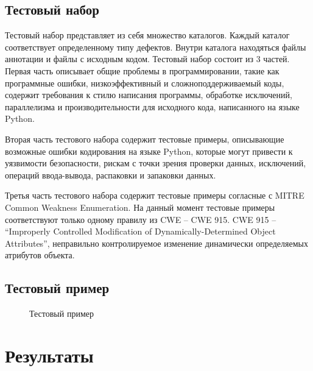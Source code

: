 \section{Тестовый набор}\label{sec:ch3/sect3}
Тестовый набор представляет из себя множество каталогов. Каждый каталог соответствует определенному типу дефектов. 
Внутри каталога находяться файлы аннотации и файлы с исходным кодом. Тестовый набор состоит из 3 частей. 
Первая часть описывает общие проблемы в
программировании, такие как программные ошибки, низкоэффективный и сложноподдерживаемый коды, содержит требования к стилю написания
программы, обработке исключений, параллелизма и производительности для исходного кода, написанного на языке Python.

Вторая часть тестового набора содержит тестовые примеры, описывающие 
возможные ошибки кодирования на языке Python, которые
могут привести к уязвимости безопасности, рискам с точки зрения проверки данных, исключений, операций ввода-вывода, распаковки и запаковки данных. 

Третья часть тестового набора содержит тестовые примеры согласные с
MITRE Common Weakness Enumeration. На данный момент тестовые примеры соответствуют только одному правилу из CWE -- CWE 915. 
CWE 915 -- ``Improperly
Controlled Modification of Dynamically-Determined Object Attributes'', неправильно
контролируемое изменение динамически определяемых атрибутов объекта.

\section{Тестовый пример}
\begin{figure}[ht]
  \caption{Тестовый пример}\label{fig:testcase}
\end{figure}


\chapter{Результаты}


\clearpage
